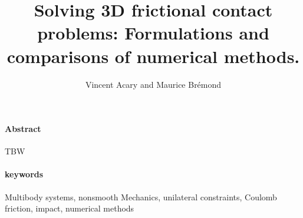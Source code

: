 \documentclass[10pt]{article}
\title{Solving 3D frictional contact problems: Formulations and comparisons of numerical methods.}
\author{Vincent Acary and Maurice Br\'emond}
\begin{document}
\pagestyle{fancy}
\thispagestyle{fancy}
\maketitle
\tableofcontents
\clearpage
{\paragraph{Abstract} TBW}

{\paragraph{keywords} Multibody systems, nonsmooth Mechanics,  unilateral constraints, Coulomb friction, impact, numerical methods}




\end{document}
